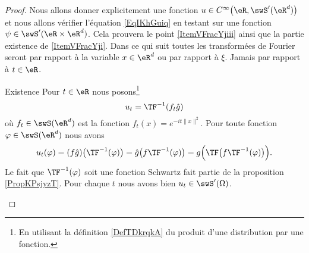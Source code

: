 \begin{proof}
    Nous allons donner explicitement une fonction \( u\in C^{\infty}\big( \eR,\swS'(\eR^d) \big)\) et nous allons vérifier l'équation \eqref{EqIKhGuiq} en testant sur une fonction \( \psi\in\swS'(\eR\times \eR^d)\). Cela prouvera le point \ref{ItemVFracYjiii} ainsi que la partie existence de \ref{ItemVFracYji}. Dans ce qui suit toutes les transformées de Fourier seront par rapport à la variable \( x\in \eR^d\) ou par rapport à \( \xi\). Jamais par rapport à \( t\in \eR\).

    \begin{subproof}
    \item[Existence]
        Pour \( t\in \eR\) nous posons\footnote{En utilisant la définition \eqref{DefTDkrqkA} du produit d'une distribution par une fonction.}
        \begin{equation}
            u_t=\TF^{-1}(f_t\hat g)
        \end{equation}
        où \( f_t\in\swS(\eR^d)\) est la fonction \( f_t(x)= e^{-it\| x \|^2}\). Pour toute fonction \( \varphi\in\swS(\eR^d)\) nous avons
        \begin{equation}
            u_t(\varphi)=(f\hat g)\big( \TF^{-1}(\varphi) \big)=\hat g\big( f\TF^{-1}(\varphi) \big)=g\Big( \TF\big( f\TF^{-1}(\varphi) \big) \Big).
        \end{equation}
        Le fait que \( \TF^{-1}(\varphi)\) soit une fonction Schwartz fait partie de la proposition \ref{PropKPsjyzT}. Pour chaque \( t\) nous avons bien \( u_t\in\swS'(\Omega)\).


\end{subproof}
\end{proof}
